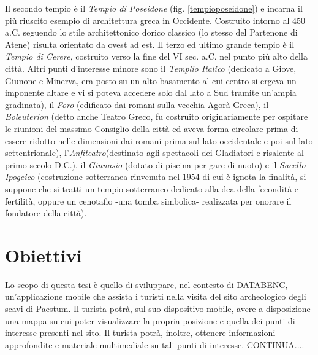 Il secondo tempio è il \emph{Tempio di Poseidone} (fig. \ref{tempioposeidone}) e incarna il più riuscito esempio di architettura greca in Occidente. Costruito intorno al 450 a.C. seguendo lo stile architettonico dorico classico (lo stesso del Partenone di Atene) risulta orientato da ovest ad est. Il terzo ed ultimo grande tempio è il \emph{Tempio di Cerere}, costruito verso la fine del VI sec. a.C. nel punto più alto della città. Altri punti d'interesse minore sono il \emph{Templio Italico} (dedicato a Giove, Giunone e Minerva, era posto su un alto basamento al cui centro si ergeva un imponente altare e vi si poteva accedere solo dal lato a Sud tramite un'ampia gradinata), il \emph{Foro} (edificato dai romani sulla vecchia Agorà Greca), il \emph{Boleuterion} (detto anche Teatro Greco, fu costruito originariamente per ospitare le riunioni del massimo Consiglio della città ed aveva forma circolare prima di essere ridotto nelle dimensioni dai romani prima sul lato occidentale e poi sul lato settentrionale), l'\emph{Anfiteatro}(destinato agli spettacoli dei Gladiatori e risalente al primo secolo D.C.), il \emph{Ginnasio} (dotato di piscina per gare di nuoto) e il \emph{Sacello Ipogeico} (costruzione sotterranea rinvenuta nel 1954 di cui è ignota la finalità, si suppone che si tratti un tempio sotterraneo dedicato alla dea della fecondità e fertilità, oppure un cenotafio -una tomba simbolica- realizzata per onorare il fondatore della città).
\section{Obiettivi}
Lo scopo di questa tesi è quello di sviluppare, nel contesto di DATABENC, un'applicazione mobile che assista i turisti nella visita del sito archeologico degli scavi di Paestum.
Il turista potrà, sul suo dispositivo mobile, avere a disposizione una mappa su cui poter visualizzare la propria posizione e quella dei punti di interesse presenti nel sito.
Il turista potrà, inoltre, ottenere informazioni approfondite e materiale multimediale su tali punti di interesse. 
CONTINUA....





\clearpage{\pagestyle{empty}\cleardoublepage}


